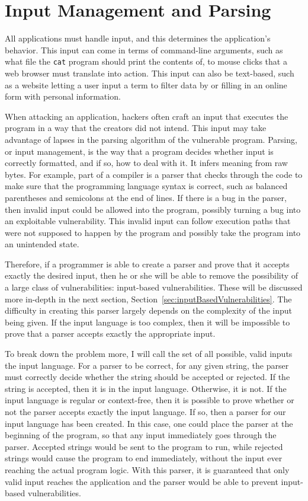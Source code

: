 \section{Input Management and Parsing}
\label{sec:inputManagement}
All applications must handle input, and this determines the application's behavior.  This input can come in terms of command-line arguments, such as what file the \texttt{cat} program should print the contents of, to mouse clicks that a web browser must translate into action.  This input can also be text-based, such as a website letting a user input a term to filter data by or filling in an online form with personal information.

When attacking an application, hackers often craft an input that executes the program in a way that the creators did not intend.  This input may take advantage of lapses in the parsing algorithm of the vulnerable program.  Parsing, or input management, is the way that a program decides whether input is correctly formatted, and if so, how to deal with it.  It infers meaning from raw bytes.  For example, part of a compiler is a parser that checks through the code to make sure that the programming language syntax is correct, such as balanced parentheses and semicolons at the end of lines.  If there is a bug in the parser, then invalid input could be allowed into the program, possibly turning a bug into an exploitable vulnerability.  This invalid input can follow execution paths that were not supposed to happen by the program and possibly take the program into an unintended state.

Therefore, if a programmer is able to create a parser and prove that it accepts exactly the desired input, then he or she will be able to remove the possibility of a large class of vulnerabilities: input-based vulnerabilities.  These will be discussed more in-depth in the next section, Section~\ref{sec:inputBasedVulnerabilities}.  The difficulty in creating this parser largely depends on the complexity of the input being given.  If the input language is too complex, then it will be impossible to prove that a parser accepts exactly the appropriate input.

To break down the problem more, I will call the set of all possible, valid inputs the input language.  For a parser to be correct, for any given string, the parser must correctly decide whether the string should be accepted or rejected.  If the string is accepted, then it is in the input language.  Otherwise, it is not.  If the input language is regular or context-free, then it is possible to prove whether or not the parser accepts exactly the input language.  If so, then a parser for our input language has been created.  In this case, one could place the parser at the beginning of the program, so that any input immediately goes through the parser.  Accepted strings would be sent to the program to run, while rejected strings would cause the program to end immediately, without the input ever reaching the actual program logic.  With this parser, it is guaranteed that only valid input reaches the application and the parser would be able to prevent input-based vulnerabilities.

